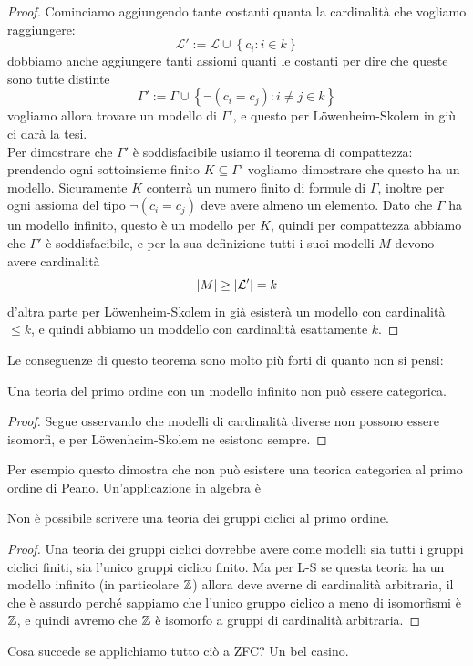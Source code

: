 \documentclass[11pt]{scrartcl}
\begin{document}
 	\begin{proof}
 		Cominciamo aggiungendo tante costanti quanta la cardinalità che vogliamo raggiungere:
 		$$\mathcal{L}':=\mathcal{L}\cup \left\{c_i:i\in k\right\}$$
 		dobbiamo anche aggiungere tanti assiomi quanti le costanti per dire che queste sono tutte distinte
 		$$\Gamma':=\Gamma \cup \left\{\lnot\left(c_i=c_j\right):i\ne j\in k \right\}$$
 		vogliamo allora trovare un modello di $\Gamma'$, e questo per L\"owenheim-Skolem in giù ci darà la tesi. \\
 		Per dimostrare che $\Gamma'$ è soddisfacibile usiamo il teorema di compattezza: prendendo ogni sottoinsieme finito $K\subseteq \Gamma'$ vogliamo dimostrare che questo ha un modello. Sicuramente $K$ conterrà un numero finito di formule di $\Gamma$, inoltre per ogni assioma del tipo $\lnot(c_i=c_j)$ deve avere almeno un elemento. Dato che $\Gamma$ ha un modello infinito, questo è un modello per $K$, quindi per compattezza abbiamo che $\Gamma'$ è soddisfacibile, e per la sua definizione tutti i suoi modelli $M$ devono avere cardinalità
 		$$\left\lvert M \right\rvert\ge \left\lvert \mathcal{L}' \right\rvert=k$$
 		d'altra parte per L\"owenheim-Skolem in già esisterà un modello con cardinalità $\le k$, e quindi abbiamo un moddello con cardinalità esattamente $k$.
 	\end{proof}
 	Le conseguenze di questo teorema sono molto più forti di quanto non si pensi:
 	\begin{corollary}
 		Una teoria del primo ordine con un modello infinito non può essere categorica.
 	\end{corollary}
 	\begin{proof}
 		Segue osservando che modelli di cardinalità diverse non possono essere isomorfi, e per L\"owenheim-Skolem ne esistono sempre.
 	\end{proof}
 	Per esempio questo dimostra che non può esistere una teorica categorica al primo ordine di Peano. Un'applicazione in algebra è
 	\begin{corollary}
 		Non è possibile scrivere una teoria dei gruppi ciclici al primo ordine.
 	\end{corollary}
 	\begin{proof}
 		Una teoria dei gruppi ciclici dovrebbe avere come modelli sia tutti i gruppi ciclici finiti, sia l'unico gruppi ciclico finito. Ma per L-S se questa teoria ha un modello infinito (in particolare $\mathbb Z$) allora deve averne di cardinalità arbitraria, il che è assurdo perché sappiamo che l'unico gruppo ciclico a meno di isomorfismi è $\mathbb Z$, e quindi avremo che $\mathbb Z$ è isomorfo a gruppi di cardinalità arbitraria.
 	\end{proof}
 	Cosa succede se applichiamo tutto ciò a ZFC? Un bel casino.
\end{document}
